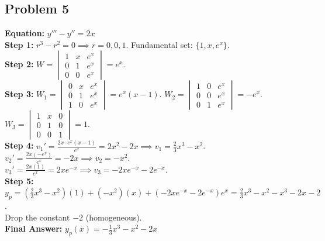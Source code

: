 \documentclass[11pt]{article}
\begin{document}
\subsection*{Problem 5}
\textbf{Equation:} $y''' - y'' = 2x$ \\
\textbf{Step 1:} $r^3 - r^2 = 0 \implies r = 0, 0, 1$. Fundamental set: $\{1, x, e^x\}$. \\
\textbf{Step 2:} $W = \begin{vmatrix} 1 & x & e^x \\ 0 & 1 & e^x \\ 0 & 0 & e^x \end{vmatrix} = e^x$. \\
\textbf{Step 3:} $W_1 = \begin{vmatrix} 0 & x & e^x \\ 0 & 1 & e^x \\ 1 & 0 & e^x \end{vmatrix} = e^x(x-1)$. $W_2 = \begin{vmatrix} 1 & 0 & e^x \\ 0 & 0 & e^x \\ 0 & 1 & e^x \end{vmatrix} = -e^x$. $W_3 = \begin{vmatrix} 1 & x & 0 \\ 0 & 1 & 0 \\ 0 & 0 & 1 \end{vmatrix} = 1$. \\
\textbf{Step 4:} $v_1' = \frac{2x \cdot e^x(x-1)}{e^x} = 2x^2 - 2x \implies v_1 = \frac{2}{3}x^3 - x^2$. \\
$v_2' = \frac{2x(-e^x)}{e^x} = -2x \implies v_2 = -x^2$. \\
$v_3' = \frac{2x(1)}{e^x} = 2xe^{-x} \implies v_3 = -2xe^{-x} - 2e^{-x}$. \\
\textbf{Step 5:} $y_p = (\frac{2}{3}x^3 - x^2)(1) + (-x^2)(x) + (-2xe^{-x} - 2e^{-x})e^x = \frac{2}{3}x^3 - x^2 - x^3 - 2x - 2$. \\
Drop the constant $-2$ (homogeneous). \\
\textbf{Final Answer:} $y_p(x) = -\frac{1}{3}x^3 - x^2 - 2x$
\end{document}
